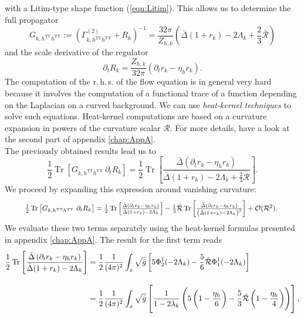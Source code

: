 with a Litim-type shape function (\ref{eqn:Litim}). This allows us to determine the full propagator
\begin{equation}
	G_{k, h^{\text{TT}}h^{\text{TT}}} := \left(\Gamma_{k, h^{\text{TT}}h^{\text{TT}}}^{(2)} + R_k\right)^{-1} = \frac{32\pi}{Z_{h,k}}\left(\bar{\Delta}\left(1+r_k\right) -2\Lambda_k + \frac{2}{3}\bar{\mathcal{R}}\right)
\end{equation}
and the scale derivative of the regulator
\begin{equation}
	\partial_t R_k =  \frac{Z_{h,k}}{32\pi}\left(\partial_tr_k - \eta_hr_k\right).
\end{equation}
The computation of the r.\,h.\,s. of the flow equation is in general very hard because it involves the computation of a functional trace of a function depending on the Laplacian on a curved background. We can use \textit{heat-kernel techniques} to solve such equations. Heat-kernel computations are based on a curvature expansion in powers of the curvature scalar $\mathcal{R}$. For more details, have a look at the second part of appendix \ref{chap:AppA}.\\
The previously obtained results lead us to
\begin{equation}
\frac{1}{2}\operatorname{Tr}\left[G_{k, h^{\text{TT}}h^{\text{TT}}}\ \partial_t R_k\right] = \frac{1}{2}\operatorname{Tr}\left[\frac{\bar{\Delta}\left(\partial_t r_k - \eta_h r_k\right)}{\bar{\Delta}(1+r_k)-2\Lambda_k+\frac{2}{3}\bar{\mathcal{R}}}\right].
\end{equation}
We proceed by expanding this expression around vanishing curvature:
\begin{align}
\resizebox{.9 \textwidth}{!}{$
\frac{1}{2}\operatorname{Tr}\left[G_{k, h^{\text{TT}}h^{\text{TT}}}\ \partial_t R_k\right] = \frac{1}{2}\operatorname{Tr}\left[\frac{\bar{\Delta}\left(\partial_t r_k - \eta_h r_k\right)}{\bar{\Delta}(1+r_k)-2\Lambda_k}\right] - \frac{1}{3}\bar{\mathcal{R}}\operatorname{Tr}\left[\frac{\bar{\Delta}\left(\partial_t r_k - \eta_h r_k\right)}{\left(\bar{\Delta}(1+r_k)-2\Lambda_k\right)^2}\right] + \mathcal{O}(\mathcal{R}^2).$
}
\end{align}
We evaluate these two terms separately using the heat-kernel formulas presented in appendix \ref{chap:AppA}. The result for the first term reads
\begin{align}
\frac{1}{2}\operatorname{Tr}\left[\frac{\bar{\Delta}\left(\partial_t r_k - \eta_h r_k\right)}{\bar{\Delta}(1+r_k)-2\Lambda_k}\right] &= \frac{1}{2}\frac{1}{(4\pi)^2}\int_x \sqrt{\bar{g}} \left[5\Phi_2^1(-2\Lambda_k) - \frac{5}{6}\bar{\mathcal{R}}\Phi^1_1(-2\Lambda_k)\right] \\[10pt]
&= \frac{1}{2}\frac{1}{(4\pi)^2}\int_x \sqrt{\bar{g}}\left[\frac{1}{1-2\lambda_k}\left(5\left(1-\frac{\eta_h}{6}\right) - \frac{5}{3}\bar{\mathcal{R}}\left(1-\frac{\eta_h}{4}\right)\right)\right],\nonumber
\end{align}
